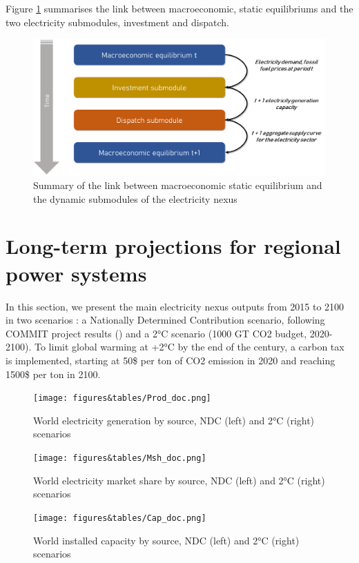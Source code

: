 Figure \ref{fig:sumacro} summarises the link between macroeconomic, static equilibriums and the two electricity submodules, investment and dispatch.

\begin{figure}[H]
    \centerline{\includegraphics[scale=0.5]{figures&tables/summacro.png}}
    \caption{Summary of the link between macroeconomic static equilibrium and the dynamic submodules of the electricity nexus}
    \label{fig:sumacro}
\end{figure}


\section{Long-term projections for regional power systems}
In this section, we present the main electricity nexus outputs from 2015 to 2100 in two scenarios : a Nationally Determined Contribution scenario, following COMMIT project results (\cite{VanSoest2021}) and a 2°C scenario (1000 GT CO2 budget, 2020-2100). To limit global warming at +2°C by the end of the century, a carbon tax is implemented, starting at 50\$ per ton of CO2 emission in 2020 and reaching 1500\$ per ton in 2100.

\begin{figure}[H]
    \centerline{\texttt{[image: figures\&tables/Prod\_doc.png]}}
    \caption{World electricity generation by source, NDC (left) and 2°C (right) scenarios}
    \label{fig:Prod}
\end{figure}

\begin{figure}[H]
    \centerline{\texttt{[image: figures\&tables/Msh\_doc.png]}}
    \caption{World electricity market share by source, NDC (left) and 2°C (right) scenarios}
    \label{fig:Msh}
\end{figure}

\begin{figure}[H]
\centerline{\texttt{[image: figures\&tables/Cap\_doc.png]}}
    \caption{World installed capacity by source, NDC (left) and 2°C (right) scenarios}
    \label{fig:Cap}
\end{figure}

